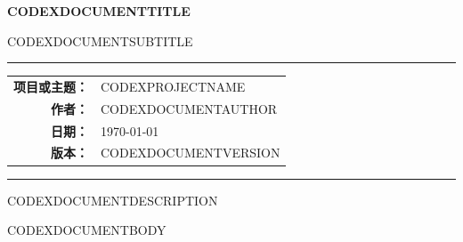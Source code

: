 \documentclass[12pt,a4paper]{article}
\newcommand{\doctitle}{CODEXDOCUMENTTITLE}
\newcommand{\docsubtitle}{CODEXDOCUMENTSUBTITLE}
\newcommand{\projectname}{CODEXPROJECTNAME}
\newcommand{\docauthor}{CODEXDOCUMENTAUTHOR}
\newcommand{\docversion}{CODEXDOCUMENTVERSION}
\newcommand{\docdescription}{CODEXDOCUMENTDESCRIPTION}
\begin{document}

\begin{titlepage}
    \centering
    \vspace*{2.8cm}

    {\Huge\bfseries\color{primaryblue}\doctitle\par}

    \vspace{0.7cm}

    {\Large\docsubtitle\par}

    \vspace{2cm}

    \rule{\linewidth}{0.6mm}

    \vspace{1cm}

    \begin{tabular}{rl}
        \textbf{项目或主题：} & \projectname \\[0.6em]
        \textbf{作者：} & \docauthor \\[0.6em]
        \textbf{日期：} & \today \\[0.6em]
        \textbf{版本：} & \docversion
    \end{tabular}

    \vspace{1cm}

    \rule{\linewidth}{0.6mm}

    \vfill

    \begin{minipage}{0.85\textwidth}
        \centering
        \small
        \docdescription
    \end{minipage}
\end{titlepage}


\tableofcontents
\newpage


CODEXDOCUMENTBODY
\end{document}
